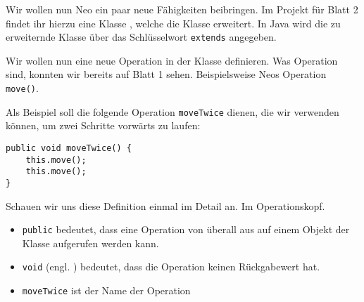 
    Wir wollen nun Neo ein paar neue Fähigkeiten beibringen.
    Im Projekt für Blatt 2 findet ihr hierzu eine Klasse \ownclass{}, welche die Klasse \superclass{} erweitert. 
    In Java wird die zu erweiternde Klasse über das Schlüsselwort \lstinline{extends} angegeben.

    Wir wollen nun eine neue Operation in der Klasse \ownclass{} definieren. 
    Was Operation sind, konnten wir bereits auf Blatt 1 sehen. 
    Beispielsweise Neos Operation \lstinline{move()}.

    Als Beispiel soll die folgende Operation \texttt{moveTwice} dienen, die wir verwenden können, um zwei Schritte vorwärts zu laufen:

    \begin{lstlisting}
public void moveTwice() {
    this.move();
    this.move();
}
    \end{lstlisting}

    Schauen wir uns diese Definition einmal im Detail an. Im Operationskopf.

    \begin{itemize}
        \item \lstinline{public} bedeutet, dass eine Operation von überall aus auf einem Objekt der Klasse aufgerufen werden kann.
        \item \lstinline{void} (engl. ) bedeutet, dass die Operation keinen Rückgabewert hat.
        \item \lstinline{moveTwice} ist der Name der Operation
    \end{itemize}

